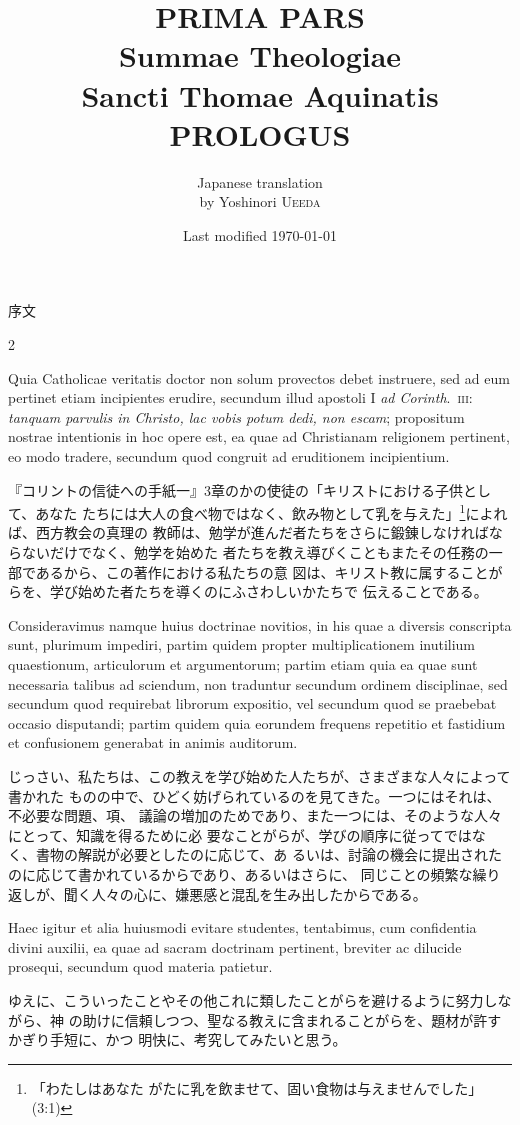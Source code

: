 \documentclass[paper=a4paper,fontsize=10pt,jafontsize=9pt,titlepage]{jlreq}
\title{{\bfseries PRIMA PARS}\\{\Huge Summae Theologiae}\\Sancti Thomae
Aquinatis\\{\sffamily PROLOGUS}}
\author{Japanese translation\\by Yoshinori {\scshape Ueeda}}
\date{Last modified \today}
\begin{document}
\maketitle

\newpage
\begin{center}
{\Large 序文}
\end{center}

\begin{paracol}{2}

Quia Catholicae veritatis doctor non solum provectos debet instruere, sed ad eum
pertinet etiam incipientes erudire, secundum illud apostoli I {\itshape ad
Corinth}.~{\scshape iii}: {\itshape tanquam parvulis in Christo, lac vobis potum
dedi, non escam}; propositum nostrae intentionis in hoc opere est, ea quae ad
Christianam religionem pertinent, eo modo tradere, secundum quod congruit ad
eruditionem incipientium.

\switchcolumn

『コリントの信徒への手紙一』3章のかの使徒の「キリストにおける子供として、あなた
たちには大人の食べ物ではなく、飲み物として乳を与えた」\footnote{「わたしはあなた
がたに乳を飲ませて、固い食物は与えませんでした」(3:1)}によれば、西方教会の真理の
教師は、勉学が進んだ者たちをさらに鍛錬しなければならないだけでなく、勉学を始めた
者たちを教え導びくこともまたその任務の一部であるから、この著作における私たちの意
図は、キリスト教に属することがらを、学び始めた者たちを導くのにふさわしいかたちで
伝えることである。

\switchcolumn*

Consideravimus namque huius doctrinae novitios, in his quae a diversis
conscripta sunt, plurimum impediri, partim quidem propter multiplicationem
inutilium quaestionum, articulorum et argumentorum; partim etiam quia ea quae
sunt necessaria talibus ad sciendum, non traduntur secundum ordinem disciplinae,
sed secundum quod requirebat librorum expositio, vel secundum quod se praebebat
occasio disputandi; partim quidem quia eorundem frequens repetitio et fastidium
et confusionem generabat in animis auditorum.

\switchcolumn

じっさい、私たちは、この教えを学び始めた人たちが、さまざまな人々によって書かれた
ものの中で、ひどく妨げられているのを見てきた。一つにはそれは、不必要な問題、項、
議論の増加のためであり、また一つには、そのような人々にとって、知識を得るために必
要なことがらが、学びの順序に従ってではなく、書物の解説が必要としたのに応じて、あ
るいは、討論の機会に提出されたのに応じて書かれているからであり、あるいはさらに、
同じことの頻繁な繰り返しが、聞く人々の心に、嫌悪感と混乱を生み出したからである。

\switchcolumn*

Haec igitur et alia huiusmodi evitare studentes, tentabimus, cum confidentia
divini auxilii, ea quae ad sacram doctrinam pertinent, breviter ac dilucide
prosequi, secundum quod materia patietur.

\switchcolumn

ゆえに、こういったことやその他これに類したことがらを避けるように努力しながら、神
の助けに信頼しつつ、聖なる教えに含まれることがらを、題材が許すかぎり手短に、かつ
明快に、考究してみたいと思う。

\end{paracol}
\end{document}
